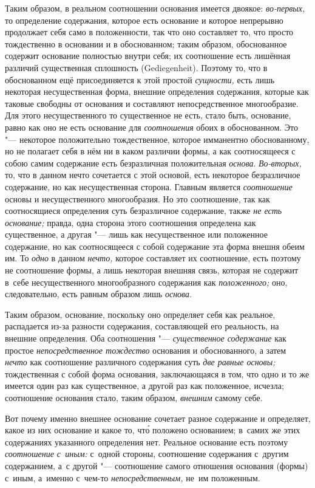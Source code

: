 Таким образом, в реальном соотношении основания имеется двоякое:
{\em во-первых,} то определение содержания, которое есть основание и которое
непрерывно продолжает себя само в положенности, так что оно составляет то, что
просто тождественно в основании и в обоснованном; таким образом, обоснованное
содержит основание полностью внутри себя; их соотношение есть лишённая различий
существенная сплошность (Gedie\-gen\-heit). Поэтому то, что в обоснованном ещё
присоединяется к этой простой {\em сущности,} есть лишь некоторая
несущественная форма, внешние определения содержания, которые как таковые
свободны от основания и составляют непосредственное многообразие. Для этого
несущественного то существенное не есть, стало быть, основание, равно как оно
не есть основание для {\em соотношения} обоих в обоснованном. Это "---
некоторое положительно тождественное, которое имманентно обоснованному, но не
полагает себя в нём ни в каком различии формы, а как соотносящееся с собою
самим содержание есть безразличная положительная {\em основа}. {\em Во-вторых,}
то, что в данном нечто сочетается с этой основой, есть некоторое безразличное
содержание, но как несущественная сторона. Главным является {\em соотношение}
основы и несущественного многообразия. Но это соотношение, так как
соотносящиеся определения суть безразличное содержание, также {\em не есть
основание;} правда, одна сторона этого соотношения определена как существенное,
а другая "--- лишь как несущественное или положенное содержание, но как
соотносящееся с собой содержание эта форма внешня обеим им. То {\em одно}
в данном {\em нечто,} которое составляет их соотношение, есть поэтому не
соотношение формы, а лишь некоторая внешняя связь, которая не содержит в~себе
несущественного многообразного содержания как {\em положенного;} оно,
следовательно, есть равным образом лишь {\em основа}.

Таким образом, основание, поскольку оно определяет себя как реальное,
распадается из-за разности содержания, составляющей его реальность, на внешние
определения. Оба соотношения "--- {\em существенное содержание} как простое
{\em непосредственное тождество} основания и обоснованного, а затем {\em нечто}
как соотношение различного содержания суть {\em две равные основы;}
тождественная с собой форма основания, заключающаяся в том, что одно и то же
имеется один раз как существенное, а другой раз как положенное, исчезла;
соотношение основания стало, таким образом, {\em внешним} самому себе.

Вот почему именно внешнее основание сочетает разное содержание и определяет,
какое из них основание и какое то, чт\'{о} положено основанием; в~самих же
этих содержаниях указанного определения нет. Реальное основание есть поэтому
{\em соотношение с~иным:} с~одной стороны, соотношение содержания с~другим
содержанием, а~с другой "--- соотношение самого отношения основания (формы)
с~иным, а~именно с~чем-то {\em непосредственным,} не~им положенным.

